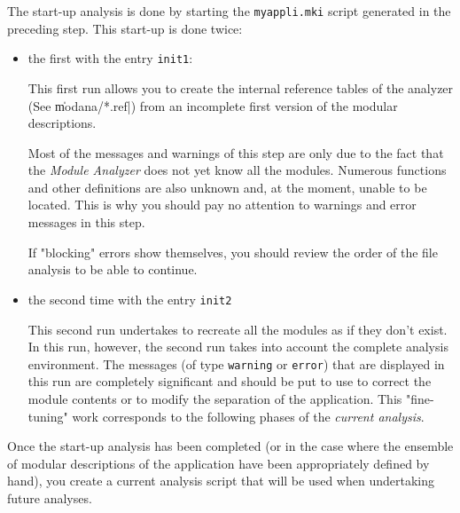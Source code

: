 
The start-up analysis is done by starting the {\tt myappli.mki} script generated in the preceding step.  This start-up is done twice:

\begin{itemize}

\item the first with the entry {\tt init1}:
\begin{Code*}
\end{Code*}
This first run allows you to create the internal reference tables of the analyzer (See \|modana/*.ref|) from an incomplete first version of the modular descriptions. 


Most of the messages and warnings of this step are only due to the fact that the {\em Module Analyzer} does not yet know all the modules.  Numerous functions and other definitions are also unknown and, at the moment, unable to be located.  This is why you should pay no attention to warnings and error messages in this step.

If "blocking" errors show themselves, you should review the order of the file analysis to be able to continue.

\item the second time with the entry {\tt init2}
\begin{Code*}
\end{Code*}

This second run undertakes to recreate all the modules as if they don't exist.  In this run, however, the second run takes into account the complete analysis environment. 
The messages (of type {\tt warning} or {\tt error}) that are displayed in this run are completely significant and should be put to use to correct the module contents or to modify the separation of the application.  This  
"fine-tuning" work corresponds to the following phases of the 
{\em current analysis}.
\end{itemize}



Once the start-up analysis has been completed (or in the case where the ensemble of modular descriptions of the application have been appropriately defined by hand), you create a current analysis script that will be used when undertaking future analyses.

